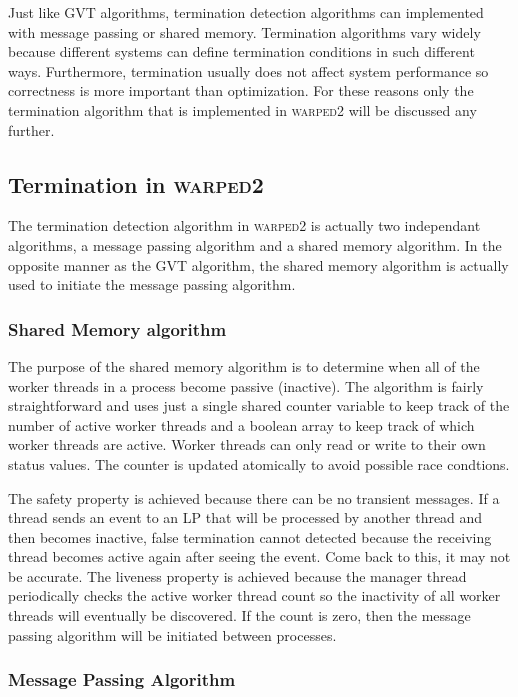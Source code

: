 \documentclass[11pt]{book}
\begin{document}
Just like GVT algorithms, termination detection algorithms can implemented with message
passing or shared memory. Termination algorithms vary widely because different systems
can define termination conditions in such different ways. Furthermore, termination usually
does not affect system performance so correctness is more important than optimization.
For these reasons only the termination algorithm that is implemented in \textsc{warped2}
will be discussed any further.

\subsection{Termination in \textsc{warped2}}

The termination detection algorithm in \textsc{warped2} is actually two independant algorithms,
a message passing algorithm and a shared memory algorithm. In the opposite manner as the
GVT algorithm, the shared memory algorithm is actually used to initiate the message passing
algorithm.

\subsubsection{Shared Memory algorithm}

The purpose of the shared memory algorithm is to determine when all of the worker threads
in a process become passive (inactive). The algorithm is fairly straightforward and uses
just a single shared counter variable to keep track of the number of active worker threads
and a boolean array to keep track of which worker threads are active. Worker threads can
only read or write to their own status values. The counter is updated atomically to avoid
possible race condtions.

The safety property is achieved because there can be no transient messages. If a thread
sends an event to an LP that will be processed by another thread and then becomes inactive,
false termination cannot detected because the receiving thread becomes active again after
seeing the event. Come back to this, it may not be accurate.
The liveness property is achieved because the manager thread periodically checks the
active worker thread count so the inactivity of all worker threads will eventually be
discovered. If the count is zero, then the message passing algorithm will be initiated
between processes.

\subsubsection{Message Passing Algorithm}
\end{document}
